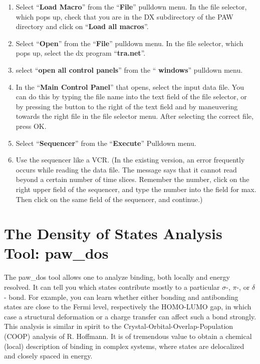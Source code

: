 \documentclass[final,12pt,makeidx,DIV=calc]{article}
\begin{document}
{{{{{{\bigskip{}\bigskip

\begin{enumerate}
\item Select ``{\bf Load Macro}'' from the ``{\bf File}'' pulldown
  menu. In the file selector, which pops up, check that you are in
  the DX subdirectory of the PAW directory and click on ``{\bf Load
    all macros}''.
\item Select ``{\bf Open}'' from the ``{\bf File}'' pulldown menu. In the file
  selector, which pops up, select the dx program ``{\bf tra.net}''.
\item select ``{\bf open all control panels}'' from the ``{\bf
    windows}'' pulldown menu.
\item In the ``{\bf Main Control Panel}'' that opens, select the input
  data file. You can do this by typing the file name into the text
  field of the file selector, or by pressing the button to the right of
  the text field and by maneuvering towards the right file in the
  file selector menu. After selecting the correct file, press OK.
\item Select ``{\bf Sequencer}'' from the ``{\bf Execute}'' Pulldown menu.
\item Use the sequencer like a VCR. (In the existing version, an error
  frequently occurs while reading the data file. The message says that it
  cannot read beyond a certain number of time slices. Remember the
  number, click on the right upper field of the sequencer, and type the
  number into the field for max. Then click on the same field of the
  sequencer, and continue.)
\end{enumerate}

\newpage
\section{The Density of States Analysis Tool: paw\_dos}
The paw\_dos tool allows one to analyze binding, both locally and
energy resolved. It can tell you which states contribute mostly to a
particular $\sigma$-, $\pi$-, or $\delta$- bond. For example, you can
learn whether either bonding and antibonding states are close to the
Fermi level, respectively the HOMO-LUMO gap, in which case a
structural deformation or a charge transfer can affect such a bond
strongly. This analysis is similar in spirit to the
Crystal-Orbital-Overlap-Population (COOP) analysis of R.
Hoffmann.\cite{hughbanks83_jacs105_3528} It is of tremendous value to
obtain a chemical (local) description of binding in complex systems,
where states are delocalized and closely spaced in energy.

}}}}}}
\end{document}
